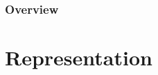 \documentclass[english,11pt,table,handout]{beamer}
\date{09 September 2015}
\begin{document}
\begin{frame}
  \maketitle
\end{frame}

\begin{frame}\frametitle<presentation>{Overview}
  \tableofcontents
\end{frame}


\section{Representation}
\end{document}
